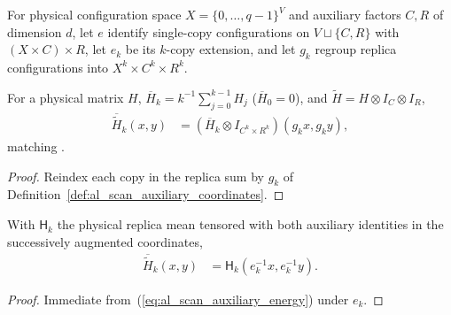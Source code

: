 \begin{definition}
    \label{def:al_scan_auxiliary_coordinates}
    \leanok
    For physical configuration space $X=\{0,\ldots,q-1\}^V$ and auxiliary
    factors $C,R$ of dimension $d$, let $e$ identify single-copy configurations
    on $V\sqcup\{C,R\}$ with $(X\times C)\times R$, let $e_k$ be its $k$-copy
    extension, and let $g_k$ regroup replica configurations into
    $X^k\times C^k\times R^k$.
\end{definition}

\begin{lemma}
    \label{thm:al_scan_auxiliary_energy}
    \leanok
    For a physical matrix $H$, $\overline H_k=k^{-1}\sum_{j=0}^{k-1}H_j$
    ($\overline H_0=0$), and $\widetilde H=H\otimes I_C\otimes I_R$,
    \begin{align}
        \overline{\widetilde H}_k(x,y)
         & = (\overline H_k\otimes I_{C^k\times R^k})(g_kx,g_ky),
        \label{eq:al_scan_auxiliary_energy}
    \end{align}
    matching \cite[Proposition~7.4 and Section~8]{OpenAI2026AreaLaw}.
\end{lemma}
\begin{proof}\leanok
    Reindex each copy in the replica sum by $g_k$ of
    Definition~\ref{def:al_scan_auxiliary_coordinates}.
\end{proof}

\begin{lemma}
    \label{thm:al_scan_global_replica_energy}
    \leanok
    With $\mathsf H_k$ the physical replica mean tensored with both auxiliary
    identities in the successively augmented coordinates,
    \begin{align}
        \overline{\widetilde H}_k(x,y)
         & =\mathsf H_k(e_k^{-1}x,e_k^{-1}y).
        \label{eq:al_scan_global_replica_energy}
    \end{align}
\end{lemma}
\begin{proof}\leanok
    Immediate from~(\ref{eq:al_scan_auxiliary_energy}) under $e_k$.
\end{proof}

